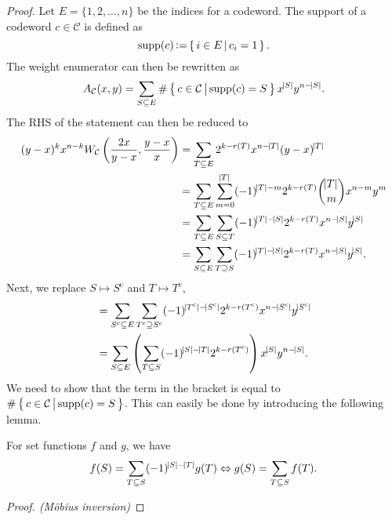 \begin{proof}
    Let $E=\{1,2,\ldots,n\}$ be the indices for a codeword. The support of a codeword $c\in\mathcal{C}$ is defined as
    \begin{equation*}
        \mathrm{supp}(c) \operatorname{\vcentcolon=} \left\{\,{i\in E}\,\middle\vert\,{c_i=1}\,\right\}.
    \end{equation*}
    The weight enumerator can then be rewritten as
    \begin{equation*}
        A_\mathcal{C}(x,y) = \sum_{S\subseteq E} \#\left\{\,{c\in\mathcal{C}}\,\middle\vert\,{\mathrm{supp}(c)=S}\,\right\} x^{\abs{S}} y^{n-\abs{S}}.
    \end{equation*}
    The RHS of the statement can then be reduced to
    \begin{align*}
        (y-x)^kx^{n-k} W_\mathcal{C}\left(\frac{2x}{y-x},\frac{y-x}{x}\right) &= \sum_{T\subseteq E} 2^{k-r(T)} x^{n-\abs{T}} (y-x)^{\abs{T}} \\
        &= \sum_{T\subseteq E}\sum_{m=0}^{\abs{T}} (-1)^{\abs{T}-m} 2^{k-r(T)} \binom{\abs{T}}{m} x^{n-m} y^m \\
        &= \sum_{T\subseteq E} \sum_{S\subseteq T} (-1)^{\abs{T}-\abs{S}} 2^{k-r(T)} x^{n-\abs{S}}y^{\abs{S}} \\
        &= \sum_{S\subseteq E} \sum_{T\supseteq S} (-1)^{\abs{T}-\abs{S}} 2^{k-r(T)} x^{n-\abs{S}}y^{\abs{S}}.
    \end{align*}
    Next, we replace $S\mapsto S^\mathrm{c}$ and $T\mapsto T^\mathrm{c}$,
    \begin{align*}
        &= \sum_{S^\mathrm{c}\subseteq E} \sum_{T^\mathrm{c}\supseteq S^\mathrm{c}} (-1)^{\abs{T^\mathrm{c}}-\abs{S^\mathrm{c}}} 2^{k-r(T^\mathrm{c})} x^{n-\abs{S^\mathrm{c}}}y^{\abs{S^\mathrm{c}}} \\
        &= \sum_{S\subseteq E} \left(\sum_{T\subseteq S} (-1)^{\abs{S}-\abs{T}} 2^{k-r(T^\mathrm{c})}\right) x^{\abs{S}} y^{n-\abs{S}}.
    \end{align*}
    We need to show that the term in the bracket is equal to $\#\left\{\,{c\in\mathcal{C}}\,\middle\vert\,{\mathrm{supp}(c)=S}\,\right\}$. This can easily be done by introducing the following lemma.
    \begin{lemma}
        For set functions $f$ and $g$, we have
        \begin{equation}
            f(S) = \sum_{T\subseteq S} (-1)^{\abs{S}-\abs{T}} g(T) \Leftrightarrow g(S) = \sum_{T\subseteq S} f(T).
        \end{equation}
    \end{lemma}
    \textit{Proof. (M\"obius inversion)}\;

\end{proof}
